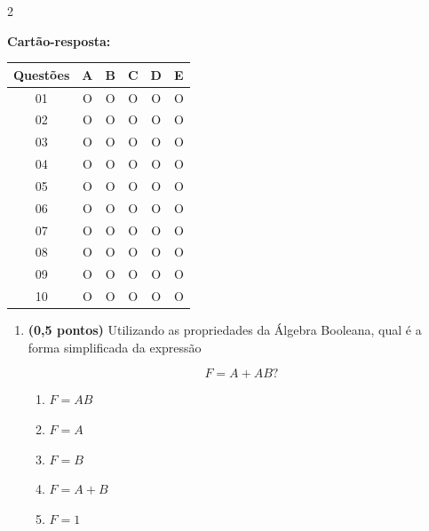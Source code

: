 \documentclass[a4paper,12pt]{article}
\begin{document}
\begin{multicols}{2}
\raggedcolumns

\textbf{Cartão-resposta:}

\vspace{0.2cm}

\begin{tabular}{|c|c|c|c|c|c|}
\hline
\textbf{Questões} & A & B & C & D & E \\
\hline
01 & O & O & O & O & O \\
\hline
02 & O & O & O & O & O \\
\hline
03 & O & O & O & O & O \\
\hline
04 & O & O & O & O & O \\
\hline
05 & O & O & O & O & O \\
\hline
06 & O & O & O & O & O \\
\hline
07 & O & O & O & O & O \\
\hline
08 & O & O & O & O & O \\
\hline
09 & O & O & O & O & O \\
\hline
10 & O & O & O & O & O \\
\hline
\end{tabular}

\vspace{0.7cm}

\begin{enumerate}[leftmargin=*]


\item \textbf{(0,5 pontos)} Utilizando as propriedades da Álgebra Booleana,
qual é a forma simplificada da expressão

\[
F=A+AB?
\]

\begin{enumerate}[label=(\Alph*)]
    \item $F=AB$
    \item $F=A$
    \item $F=B$
    \item $F=A+B$
    \item $F=1$
\end{enumerate}

\vspace{0.2cm}



\end{enumerate}
\end{multicols}
\end{document}
